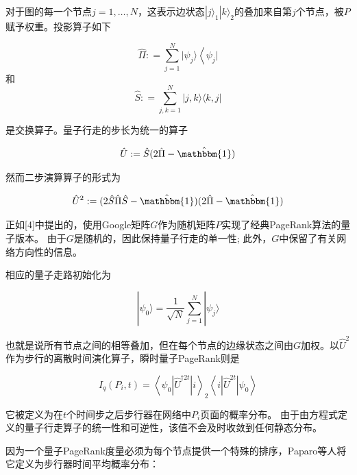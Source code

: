 对于图的每一个节点$j = 1 , \dots , N$，这表示边状态$| j \rangle _ { 1 } | k \rangle _ { 2 }$的叠加来自第$j$个节点，被$P$赋予权重。投影算子如下

\begin{equation}
	\hat { \Pi } : = \sum _ { j = 1 } ^ { N } | \psi _ { j } \rangle \left\langle \psi _ { j } |\right.
\end{equation}
和
\begin{equation}
	\hat { S } : = \sum _ { j , k = 1 } ^ { N } | j , k \rangle \langle k , j |
\end{equation}

是交换算子。量子行走的步长为统一的算子

\begin{equation}
	\hat { U } : = \hat { S } ( 2 \hat { \Pi } - \hat { \mathbbm { 1 } } )
\end{equation}

然而二步演算算子的形式为

\begin{equation}
	\hat { U } ^ { 2 } : = ( 2 \hat { S } \hat { \Pi } \hat { S } - \hat { \mathbbm { 1 } } ) ( 2 \hat { \Pi } - \hat { \mathbbm { 1 } } )
\end{equation}

正如[4]中提出的，使用Google矩阵$G$作为随机矩阵$P$实现了经典PageRank算法的量子版本。 由于$G$是随机的，因此保持量子行走的单一性; 此外，$G$中保留了有关网络方向性的信息。

相应的量子走路初始化为

\begin{equation}
	| \psi _ { 0 } \rangle = \frac { 1 } { \sqrt { N } } \sum _ { j = 1 } ^ { N } | \psi _ { j } \rangle
\end{equation}

也就是说所有节点之间的相等叠加，但在每个节点的边缘状态之间由$G$加权。以$\hat{U}^2$作为步行的离散时间演化算子，瞬时量子PageRank则是

\begin{equation}
	I _ { q } \left( P _ { i } , t \right) = \left\langle \psi _ { 0 } \left| \hat { U } ^ { \dagger 2 t } \right| i \right\rangle _ { 2 } \left\langle i \left| \hat { U } ^ { 2 t } \right| \psi _ { 0 } \right\rangle
\end{equation}

它被定义为在$t$个时间步之后步行器在网络中$P_i$页面的概率分布。 由于由方程式定义的量子行走算子的统一性和可逆性，该值不会及时收敛到任何静态分布。

因为一个量子PageRank度量必须为每个节点提供一个特殊的排序，Paparo等人将它定义为步行器时间平均概率分布：

